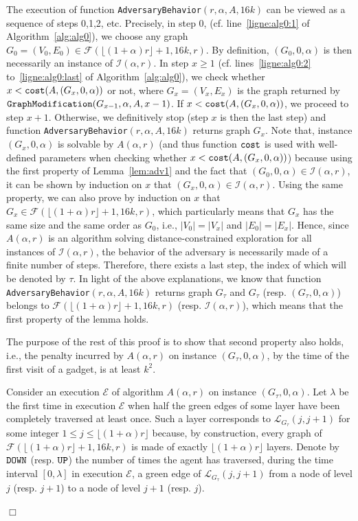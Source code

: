 \documentclass[11pt]{article}
\newcommand{\qed}{\hfill $\Box$ \bigbreak}
\newenvironment{proof}{\noindent {\bf Proof.}}{\qed}
\begin{document}
{\begin{proof}
The execution of function {\tt AdversaryBehavior}$(r,\alpha,A,16k)$ can be viewed as a sequence of steps 0,1,2, etc. Precisely, in step $0$, (cf. line~\ref{ligne:alg0:1} of Algorithm~\ref{alg:alg0}), we choose any graph $G_0=(V_0,E_0)\in\mathcal{F}(\lfloor(1+\alpha)r\rfloor+1,16k,r)$. By definition, $(G_0,0,\alpha)$ is then necessarily an instance of $\mathcal{I}(\alpha,r)$. In step $x\geq1$ (cf. lines~\ref{ligne:alg0:2} to~\ref{ligne:alg0:last} of Algorithm~\ref{alg:alg0}), we check whether $x< {\tt cost}(A,(G_x,0,\alpha))$ or not, where $G_x=(V_x,E_x)$ is the graph returned by ${\tt GraphModification}(G_{x-1},\alpha,A,x-1)$. If $x<{\tt cost}(A,(G_x,0,\alpha))$, we proceed to step $x+1$. Otherwise, we definitively stop (step $x$ is then the last step) and function {\tt AdversaryBehavior}$(r,\alpha,A,16k)$ returns graph $G_x$. Note that, instance $(G_x,0,\alpha)$ is solvable by $A(\alpha,r)$ (and thus function ${\tt cost}$ is used with well-defined parameters when checking whether $x<{\tt cost}(A,(G_x,0,\alpha))$) because using the first property of Lemma~\ref{lem:adv1} and the fact that $(G_0,0,\alpha)\in \mathcal{I}(\alpha,r)$, it can be shown by induction on $x$ that $(G_x,0,\alpha)\in\mathcal{I}(\alpha,r)$. Using the same property, we can also prove by induction on $x$ that $G_x\in\mathcal{F}(\lfloor(1+\alpha)r\rfloor+1,16k,r)$, which particularly means that $G_x$ has the same size and the same order as $G_0$, i.e., $|V_0|=|V_x|$ and $|E_0|=|E_x|$. Hence, since $A(\alpha,r)$ is an algorithm solving distance-constrained exploration for all instances of $\mathcal{I}(\alpha,r)$, the behavior of the adversary is necessarily made of a finite number of steps. Therefore, there exists a last step, the index of which will be denoted by $\tau$. In light of the above explanations, we know that function {\tt AdversaryBehavior}$(r,\alpha,A,16k)$ returns graph $G_{\tau}$ and $G_{\tau}$ (resp. $(G_{\tau},0,\alpha)$) belongs to $\mathcal{F}(\lfloor(1+\alpha)r\rfloor+1,16k,r)$ (resp. $\mathcal{I}(\alpha,r)$), which means that the first property of the lemma holds.


The purpose of the rest of this proof is to show that second property also holds, i.e., the penalty incurred by $A(\alpha,r)$ on instance $(G_{\tau},0,\alpha)$, by the time of the first visit of a gadget, is at least $k^2$.




Consider an execution $\mathcal{E}$ of algorithm $A(\alpha,r)$ on instance $(G_{\tau},0,\alpha)$. Let $\lambda$ be the first time in execution $\mathcal{E}$ when half the green edges of some layer have been completely traversed at least once. Such a layer corresponds to $\mathcal{L}_{G_{\tau}}(j,j+1)$ for some integer $1\leq j\leq \lfloor(1+\alpha)r\rfloor$ because, by construction, every graph of $\mathcal{F}(\lfloor(1+\alpha)r\rfloor+1,16k,r)$ is made of exactly $\lfloor(1+\alpha)r\rfloor$ layers. Denote by ${\tt DOWN}$ (resp. ${\tt UP}$) the number of times the agent has traversed, during the time interval $[0,\lambda]$ in execution $\mathcal{E}$, a green edge of $\mathcal{L}_{G_{\tau}}(j,j+1)$ from a node of level $j$ (resp. $j+1$) to a node of level $j+1$ (resp. $j$).


\end{proof}}
\end{document}
